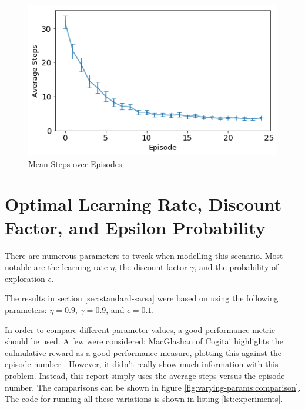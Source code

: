 \documentclass[11pt,journal,transmag,final]{IEEEtran}
\begin{document}
    \begin{figure}
        \begin{center}
            \includegraphics[width=\linewidth,keepaspectratio]{figures/ss-mean-steps.png}
            \caption{Mean Steps over Episodes}
            \label{fig:standard-sarsa:mean-steps}
        \end{center}
    \end{figure}

    \section{Optimal Learning Rate, Discount Factor, and Epsilon Probability}

    There are numerous parameters to tweak when modelling this scenario. Most notable are the learning rate $\eta$, the discount factor $\gamma$, and the probability of exploration $\epsilon$.

    The results in section \ref{sec:standard-sarsa} were based on using the following parameters: $\eta = 0.9$, $\gamma = 0.9$, and $\epsilon = 0.1$.

    In order to compare different parameter values, a good performance metric should be used. A few were considered: MacGlashan of Cogitai highlights the culmulative reward as a good performance measure, plotting this against the episode number \cite{LearningPerformance}. However, it didn't really show much information with this problem. Instead, this report simply uses the average steps versus the episode number. The camparisons can be shown in figure \ref{fig:varying-params:comparison}. The code for running all these variations is shown in listing \ref{lst:experiments}.
\end{document}
